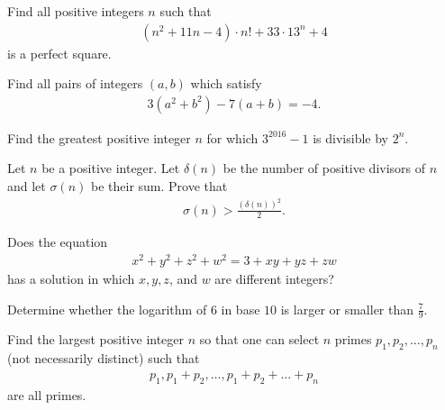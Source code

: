 \documentclass[problems.tex]{subfile}
\begin{document}
	
	\begin{problem}
		Find all positive integers $n$ such that
		\begin{align*}
			\left(n^2+11n-4\right)\cdot n! + 33 \cdot 13^n + 4
		\end{align*}
		is a perfect square.
	\end{problem}
	
	
	\begin{problem}
		Find all pairs of integers $(a, b)$ which satisfy
		\begin{align*}
			3 (a^2 + b^2 ) - 7 (a + b) = -4.
		\end{align*}
	\end{problem}
	
	
	\begin{problem}
		Find the greatest positive integer $n$ for which $3^{2016} - 1$ is divisible by $2^n$.
	\end{problem}
	
	
	\begin{problem}
		Let $n$ be a positive integer. Let $\delta(n)$ be the number of positive divisors of $n$ and let $\sigma(n)$ be their sum. Prove that
		\begin{align*}
			\sigma(n) > \frac{\left(\delta(n)\right)^2}{2}.
		\end{align*}
	\end{problem}
	
	
	\begin{problem}
		Does the equation
		\begin{align*}
			x^2+y^2+z^2+w^2=3 + xy + yz + zw
		\end{align*}
		has a solution in which $x, y, z$, and $w$ are different integers?
	\end{problem}
	
	\begin{problem}
		Determine whether the logarithm of $6$ in base $10$ is larger or smaller than $\displaystyle\frac{7}{9}$.
	\end{problem}
	
	
	\begin{problem}
		Find the largest positive integer $n$ so that one can select $n$ primes $p_1, p_2, \dots, p_n$ (not necessarily distinct) such that
		\begin{align*}
			p_1, p_1+p_2, \dots, p_1+p_2+\dots+p_n
		\end{align*}
		are all primes.
	\end{problem}
	
\end{document}

